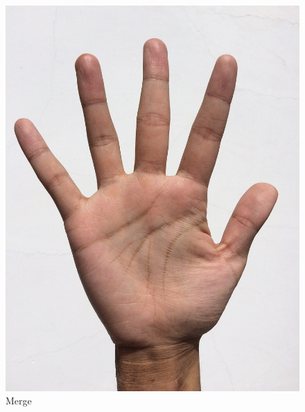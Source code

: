 \documentclass{article}
\begin{document}
\begin{figure}[!htb]
      \includegraphics[scale=.20]{3/.report/blending/et/hand.png}
      \caption{Merge}
    \endminipage \hfill
    \end{figure}
    
\end{document}
